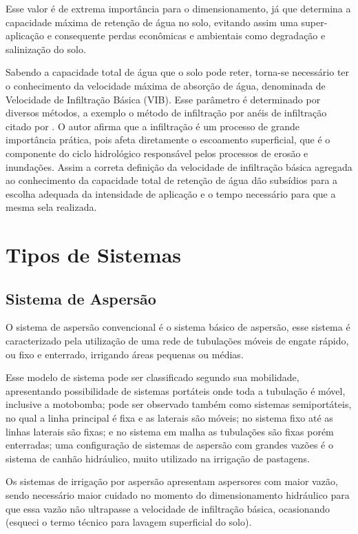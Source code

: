 Esse valor é de extrema importância para o dimensionamento, já que determina a capacidade máxima de retenção de água no solo, evitando assim uma super-aplicação e consequente perdas econômicas e ambientais como degradação e salinização do solo.

Sabendo a capacidade total de água que o solo pode reter, torna-se necessário ter o conhecimento da velocidade máxima de absorção de água, denominada de Velocidade de Infiltração Básica (VIB). Esse parâmetro é determinado por diversos métodos, a exemplo o método de infiltração por anéis de infiltração citado por \cite{carvalhosilva2006}. O autor afirma que a infiltração é um processo de grande importância prática, pois afeta diretamente o escoamento superficial, que é o componente do ciclo hidrológico responsável pelos processos de erosão e inundações. Assim a correta definição da velocidade de infiltração básica agregada ao conhecimento da capacidade total de retenção de água dão subsídios para a escolha adequada da intensidade de aplicação e o tempo necessário para que a mesma sela realizada.

\section{Tipos de Sistemas}

\subsection{Sistema de Aspersão}

O sistema de aspersão convencional é o sistema básico de aspersão, esse sistema é caracterizado pela utilização de uma rede de tubulações móveis de engate rápido, ou fixo e enterrado, irrigando áreas pequenas ou médias.

Esse modelo de sistema pode ser classificado segundo sua mobilidade, apresentando possibilidade de sistemas portáteis onde toda a tubulação é móvel, inclusive a motobomba; pode ser observado também como sistemas semiportáteis, no qual a linha principal é fixa e as laterais são móveis; no sistema fixo até as linhas laterais são fixas; e no sistema em malha as tubulações são fixas porém enterradas; uma configuração de sistemas de aspersão com grandes vazões é o sistema de canhão hidráulico, muito utilizado na irrigação de pastagens.

Os sistemas de irrigação por aspersão apresentam aspersores com maior vazão, sendo necessário maior cuidado no momento do dimensionamento hidráulico para que essa vazão não ultrapasse a velocidade de infiltração básica, ocasionando (esqueci o termo técnico para lavagem superficial do solo).

